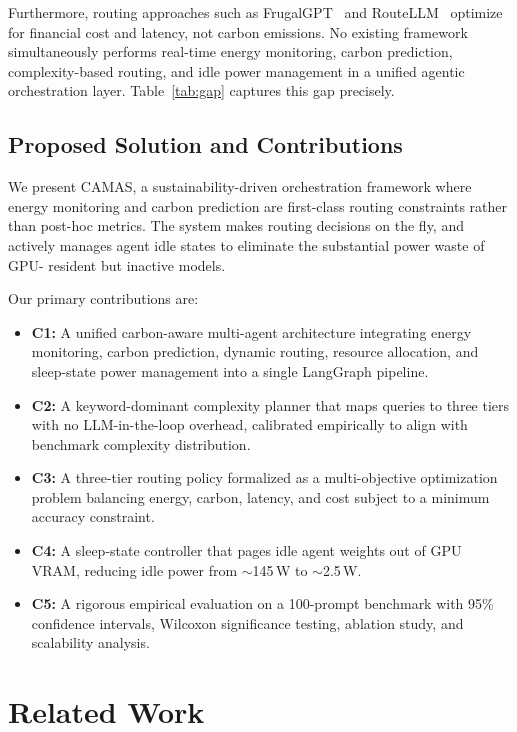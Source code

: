 \documentclass[journal]{IEEEtran}
\begin{document}
Furthermore, routing approaches such as FrugalGPT~\cite{chen2023frugalgpt} and
RouteLLM~\cite{shao2024routellm} optimize for financial cost and latency, not
carbon emissions. No existing framework simultaneously performs real-time energy
monitoring, carbon prediction, complexity-based routing, and idle power
management in a unified agentic orchestration layer. Table~\ref{tab:gap}
captures this gap precisely.

\subsection{Proposed Solution and Contributions}

We present CAMAS, a sustainability-driven orchestration framework where energy
monitoring and carbon prediction are first-class routing constraints rather than
post-hoc metrics. The system makes routing decisions on the fly, and actively
manages agent idle states to eliminate the substantial power waste of GPU-
resident but inactive models.

Our primary contributions are:
\begin{itemize}
    \item \textbf{C1:} A unified carbon-aware multi-agent architecture
    integrating energy monitoring, carbon prediction, dynamic routing, resource
    allocation, and sleep-state power management into a single LangGraph
    pipeline.
    \item \textbf{C2:} A keyword-dominant complexity planner that maps queries
    to three tiers with no LLM-in-the-loop overhead, calibrated empirically
    to align with benchmark complexity distribution.
    \item \textbf{C3:} A three-tier routing policy formalized as a
    multi-objective optimization problem balancing energy, carbon, latency, and
    cost subject to a minimum accuracy constraint.
    \item \textbf{C4:} A sleep-state controller that pages idle agent weights
    out of GPU VRAM, reducing idle power from $\sim$145\,W to $\sim$2.5\,W.
    \item \textbf{C5:} A rigorous empirical evaluation on a 100-prompt benchmark
    with 95\% confidence intervals, Wilcoxon significance testing, ablation
    study, and scalability analysis.
\end{itemize}

\section{Related Work}
\end{document}
